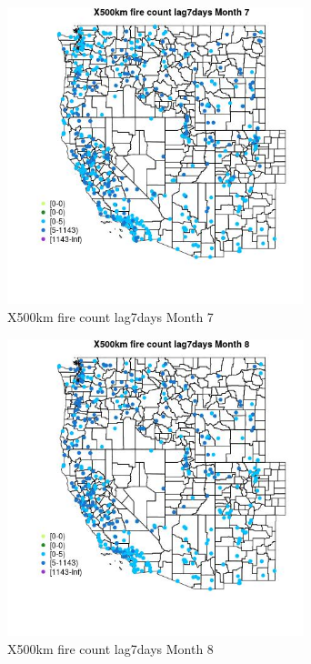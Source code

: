 \begin{figure} 
\centering  
\includegraphics[width=0.77\textwidth]{Code_Outputs/Report_ML_input_PM25_Step4_part_e_de_duplicated_aves_compiled_2019-05-14wNAs_MapObsMo7X500km_fire_count_lag7days.jpg} 
\caption{\label{fig:Report_ML_input_PM25_Step4_part_e_de_duplicated_aves_compiled_2019-05-14wNAsMapObsMo7X500km_fire_count_lag7days}X500km fire count lag7days Month 7} 
\end{figure} 
 

\begin{figure} 
\centering  
\includegraphics[width=0.77\textwidth]{Code_Outputs/Report_ML_input_PM25_Step4_part_e_de_duplicated_aves_compiled_2019-05-14wNAs_MapObsMo8X500km_fire_count_lag7days.jpg} 
\caption{\label{fig:Report_ML_input_PM25_Step4_part_e_de_duplicated_aves_compiled_2019-05-14wNAsMapObsMo8X500km_fire_count_lag7days}X500km fire count lag7days Month 8} 
\end{figure} 
 

